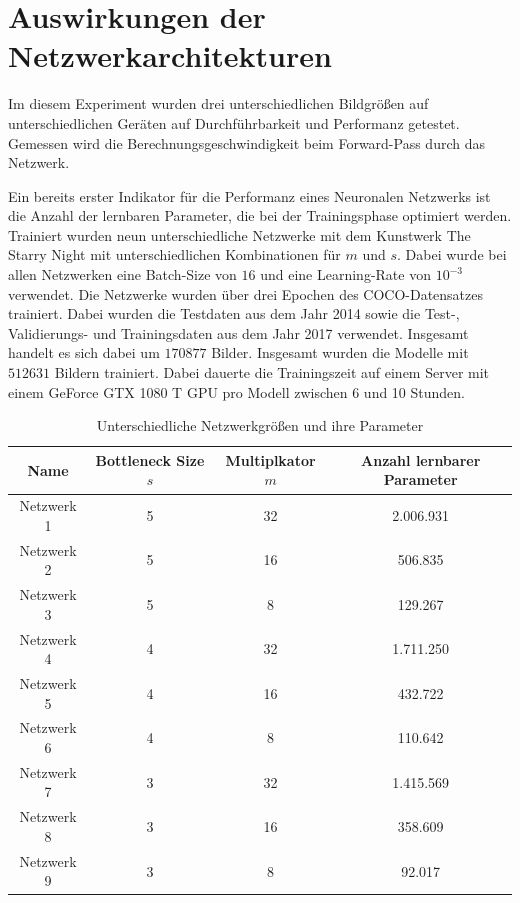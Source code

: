\section{Auswirkungen der Netzwerkarchitekturen}

Im diesem Experiment wurden drei unterschiedlichen Bildgrößen auf unterschiedlichen Geräten auf Durchführbarkeit und Performanz getestet.
Gemessen wird die Berechnungsgeschwindigkeit beim Forward-Pass durch das Netzwerk. 

Ein bereits erster Indikator für die Performanz eines Neuronalen Netzwerks ist die Anzahl der lernbaren Parameter, die bei der Trainingsphase optimiert werden. Trainiert wurden neun unterschiedliche Netzwerke mit dem Kunstwerk The Starry Night mit unterschiedlichen Kombinationen für $ m $ und $ s $. Dabei wurde bei allen Netzwerken eine Batch-Size von $ 16 $ und eine Learning-Rate von $ 10^{-3} $ verwendet. Die Netzwerke wurden über drei Epochen des COCO-Datensatzes trainiert. Dabei wurden die Testdaten aus dem Jahr 2014 sowie die Test-, Validierungs- und Trainingsdaten aus dem Jahr 2017 verwendet. Insgesamt handelt es sich dabei um $ 170877 $ Bilder. Insgesamt wurden die Modelle mit $ 512631 $ Bildern trainiert. Dabei dauerte die Trainingszeit auf einem Server mit einem GeForce GTX 1080 T GPU pro Modell zwischen 6 und 10 Stunden.

\begin{table}[H]
    \centering
    \begin{tabular}{ |c|c|c|c| }
        \hline
        \textbf{Name} & \textbf{Bottleneck Size $ s $} & \textbf{Multiplkator $ m $} & \textbf{Anzahl lernbarer Parameter} \\ \hline
        Netzwerk 1 & 5 & 32 & 2.006.931 \\ \hline
        Netzwerk 2 & 5 & 16 & 506.835 \\ \hline
        Netzwerk 3 & 5 & 8  & 129.267 \\ \hline

        Netzwerk 4 & 4 & 32 & 1.711.250 \\ \hline
        Netzwerk 5 & 4 & 16 & 432.722 \\ \hline
        Netzwerk 6 & 4 & 8  & 110.642 \\ \hline

        Netzwerk 7 & 3 & 32 & 1.415.569 \\ \hline
        Netzwerk 8 & 3 & 16 & 358.609 \\ \hline
        Netzwerk 9 & 3 & 8  & 92.017 \\ \hline
    \end{tabular}
    \caption{Unterschiedliche Netzwerkgrößen und ihre Parameter}
    \label{tab:networks}
\end{table}

